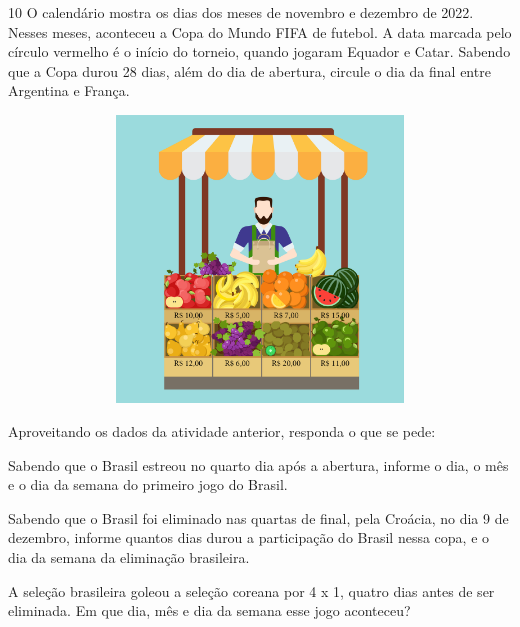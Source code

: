 \num{10} O calendário mostra os dias dos meses de novembro e dezembro de
2022. Nesses meses, aconteceu a Copa do Mundo FIFA de futebol. A data
marcada pelo círculo vermelho é o início do torneio, quando jogaram
Equador e Catar. Sabendo que a Copa durou 28 dias, além do dia de abertura, circule o dia da
final entre Argentina e França.


\includegraphics[width=6.01042in,height=3.00521in]{media/image65.png}

Aproveitando os dados da atividade anterior, responda o que se pede:

\begin{escolha}
\item Sabendo que o Brasil estreou no quarto dia após a abertura, informe o dia, o
  mês e o dia da semana do primeiro jogo do Brasil.

\reduline{\mbox{}\hfill}

\item Sabendo que o Brasil foi eliminado nas quartas de final, pela Croácia,
  no dia 9 de dezembro, informe quantos dias durou a participação do
  Brasil nessa copa, e o dia da semana da eliminação brasileira.

\reduline{\mbox{}\hfill}

\item A seleção brasileira goleou a seleção coreana por 4 x 1, quatro dias
  antes de ser eliminada. Em que dia, mês e dia da semana esse jogo
  aconteceu?

\reduline{\mbox{}\hfill}
\end{escolha}

